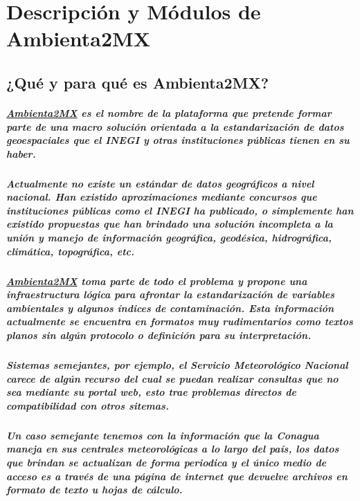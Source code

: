 \chapter {Descripción y Módulos de Ambienta2MX}
  \section {¿Qué y para qué es Ambienta2MX?}
    \paragraph {\underline{Ambienta2MX} es el nombre de la plataforma que pretende formar parte de una macro solución orientada a la estandarización de datos geoespaciales que el INEGI y otras instituciones públicas tienen en su haber.}
    \paragraph{Actualmente no existe un estándar de datos geográficos a nivel nacional. Han existido aproximaciones mediante concursos que instituciones públicas como el INEGI ha publicado, o simplemente han existido propuestas que han brindado una solución incompleta a la unión y manejo de información geográfica, geodésica, hidrográfica, climática, topográfica, etc.}
    \paragraph{\underline{Ambienta2MX} toma parte de todo el problema y propone una infraestructura lógica para afrontar la estandarización de variables ambientales y algunos índices de contaminación. Esta información actualmente se encuentra en formatos muy rudimentarios como textos planos sin algún protocolo o definición para su interpretación.}
    \paragraph{Sistemas semejantes, por ejemplo, el \textbf{Servicio Meteorológico Nacional} carece de algún recurso del cual se puedan realizar consultas que no sea mediante su portal web, esto trae problemas directos de compatibilidad con otros sitemas.}
    \paragraph{Un caso semejante tenemos con la información que la \textbf{Conagua} maneja en sus centrales meteorológicas a lo largo del país, los datos que brindan se actualizan de forma periodica y el único medio de acceso es a través de una página de internet que devuelve archivos en formato de texto u hojas de cálculo.}

